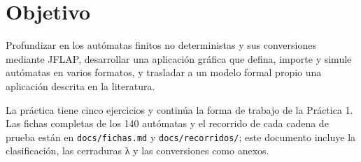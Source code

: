 \documentclass[12pt]{article}
\begin{document}


\tableofcontents
\clearpage

\section{Objetivo}
Profundizar en los autómatas finitos no deterministas y sus conversiones mediante JFLAP, desarrollar una aplicación gráfica que defina, importe y simule autómatas en varios formatos, y trasladar a un modelo formal propio una aplicación descrita en la literatura.

La práctica tiene cinco ejercicios y continúa la forma de trabajo de la Práctica 1. Las fichas completas de los 140 autómatas y el recorrido de cada cadena de prueba están en \texttt{docs/fichas.md} y \texttt{docs/recorridos/}; este documento incluye la clasificación, las cerraduras λ y las conversiones como anexos.









\clearpage
\printbibliography[title={Referencias}]

\clearpage
\appendix
{}
\renewcommand{\thesection}{\Alph{section}}
\begingroup
\singlespacing\small
\setlength{\LTpre}{0.3em}\setlength{\LTpost}{0.3em}

\endgroup
\end{document}
